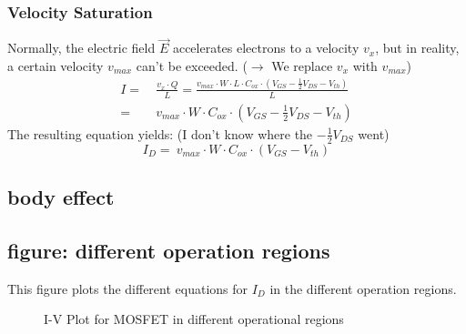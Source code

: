 \documentclass[11ypt]{extarticle}
\begin{document}
\subsubsection{Velocity Saturation}

Normally, the electric field $\vec{E}$ accelerates electrons to a velocity $v_x$, but in reality, a certain velocity $v_{max}$ can't be exceeded. ($\rightarrow$ We replace $v_x$ with $v_{max}$)
\begin{equation}
\begin{aligned}
    I =& \ \frac{v_x \cdot Q}{L} = \frac{v_{max} \cdot W \cdot L \cdot C_{ox} \cdot (V_{GS} - \frac{1}{2}V_{DS} - V_{th})}{L}
    \\
    =& \ v_{max} \cdot W \cdot C_{ox} \cdot (V_{GS} - \frac{1}{2}V_{DS} - V_{th})
\end{aligned}
\end{equation}
The resulting equation yields: (I don't know where the $- \frac{1}{2}V_{DS}$ went)
\begin{equation}
    I_D = \ v_{max} \cdot W \cdot C_{ox} \cdot (V_{GS}- V_{th})
\end{equation}

\subsection{body effect}

\subsection{figure: different operation regions}

This figure plots the different equations for $I_D$ in the different operation regions.

\tikzset{external/export next=false}
\begin{figure}[H]
\centering
    \caption{I-V Plot for MOSFET in different operational regions}
\def \plotVGS {1.1}
\def \plotVTH {0.4}
\def \plotWL {20/0.18}
\def \plotlamda {0.05}
%
\end{figure}
\end{document}
